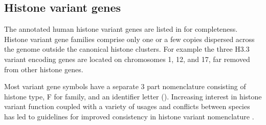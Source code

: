   \subsection{Histone variant genes}
    The \TotalCoreVariantGenes{} annotated human histone variant genes
    are listed in  for completeness.
    Histone variant gene families comprise only one or a few copies
    dispersed across the genome outside the canonical histone clusters.
    For example the three H3.3 variant encoding genes are located
    on chromosomes 1, 12, and 17, far removed from other histone genes.

    Most variant gene symbols have a separate 3 part nomenclature
    consisting of histone type, F for family,
    and an identifier letter ().
    Increasing interest in histone variant function \citep{MazeAllis2014}
    coupled with a variety of usages and conflicts between species
    has led to guidelines for improved consistency in histone variant nomenclature
    \citep{Talbert2012}.
